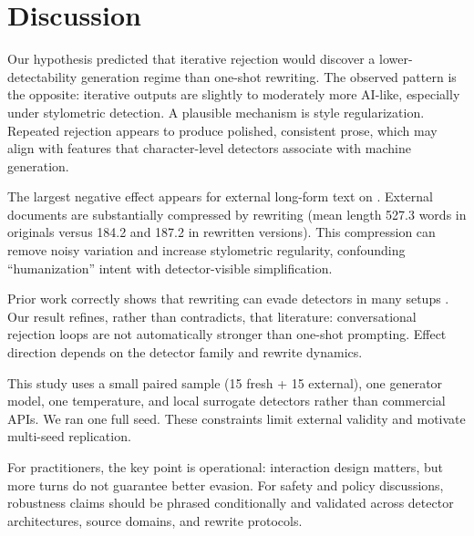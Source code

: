 \section{Discussion}
\label{sec:discussion}

 Our hypothesis predicted that iterative rejection would discover a lower-detectability generation regime than one-shot rewriting. The observed pattern is the opposite: iterative outputs are slightly to moderately more AI-like, especially under stylometric detection. A plausible mechanism is style regularization. Repeated rejection appears to produce polished, consistent prose, which may align with features that character-level detectors associate with machine generation.

 The largest negative effect appears for external long-form text on \styledet. External documents are substantially compressed by rewriting (mean length 527.3 words in originals versus 184.2 and 187.2 in rewritten versions). This compression can remove noisy variation and increase stylometric regularity, confounding ``humanization'' intent with detector-visible simplification.

 Prior work correctly shows that rewriting can evade detectors in many setups \cite{krishna2023paraphrasing,lu2024guided,zhou2024humanizing}. Our result refines, rather than contradicts, that literature: conversational rejection loops are not automatically stronger than one-shot prompting. Effect direction depends on the detector family and rewrite dynamics.

 This study uses a small paired sample (15 fresh + 15 external), one generator model, one temperature, and local surrogate detectors rather than commercial APIs. We ran one full seed. These constraints limit external validity and motivate multi-seed replication.

 For practitioners, the key point is operational: interaction design matters, but more turns do not guarantee better evasion. For safety and policy discussions, robustness claims should be phrased conditionally and validated across detector architectures, source domains, and rewrite protocols.
